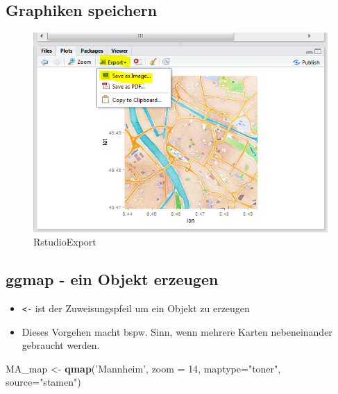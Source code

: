 \documentclass[]{article}
\newenvironment{Shaded}{\begin{snugshade}}{\end{snugshade}}
\newcommand{\KeywordTok}[1]{\textcolor[rgb]{0.13,0.29,0.53}{\textbf{{#1}}}}
\newcommand{\DataTypeTok}[1]{\textcolor[rgb]{0.13,0.29,0.53}{{#1}}}
\newcommand{\DecValTok}[1]{\textcolor[rgb]{0.00,0.00,0.81}{{#1}}}
\newcommand{\StringTok}[1]{\textcolor[rgb]{0.31,0.60,0.02}{{#1}}}
\newcommand{\NormalTok}[1]{{#1}}
\providecommand{\tightlist}{%
  \setlength{\itemsep}{0pt}\setlength{\parskip}{0pt}}
\begin{document}
\subsection{Graphiken speichern}\label{graphiken-speichern}

\begin{figure}[htbp]
\centering
\includegraphics{figure/RstudioExport.PNG}
\caption{RstudioExport}
\end{figure}

\subsection{ggmap - ein Objekt
erzeugen}\label{ggmap---ein-objekt-erzeugen}

\begin{itemize}
\tightlist
\item
  \texttt{\textless{}-} ist der Zuweisungspfeil um ein Objekt zu
  erzeugen
\item
  Dieses Vorgehen macht bspw. Sinn, wenn mehrere Karten nebeneinander
  gebraucht werden.
\end{itemize}

\begin{Shaded}
\begin{Highlighting}[]
\NormalTok{MA_map <-}\StringTok{ }\KeywordTok{qmap}\NormalTok{(}\StringTok{'Mannheim'}\NormalTok{, }
               \DataTypeTok{zoom =} \DecValTok{14}\NormalTok{,}
               \DataTypeTok{maptype=}\StringTok{"toner"}\NormalTok{,}
               \DataTypeTok{source=}\StringTok{"stamen"}\NormalTok{)}
\end{Highlighting}
\end{Shaded}
\end{document}
